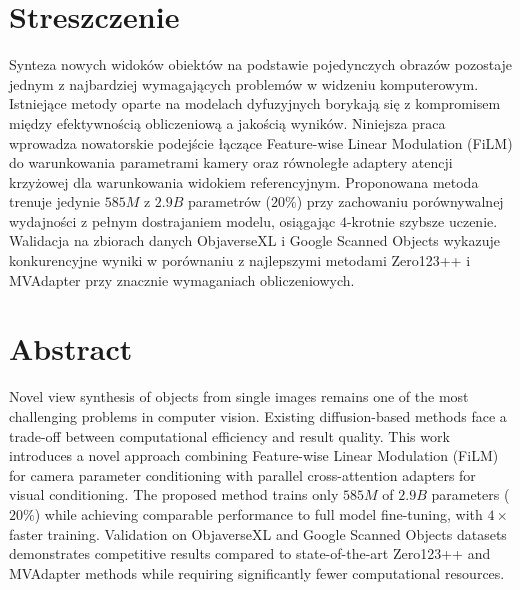\section*{Streszczenie}

Synteza nowych widoków obiektów na podstawie pojedynczych obrazów pozostaje jednym z najbardziej wymagających problemów w widzeniu komputerowym. Istniejące metody oparte na modelach dyfuzyjnych borykają się z kompromisem między efektywnością obliczeniową a jakością wyników. Niniejsza praca wprowadza nowatorskie podejście łączące Feature-wise Linear Modulation (FiLM) do warunkowania parametrami kamery oraz równoległe adaptery atencji krzyżowej dla warunkowania widokiem referencyjnym.
Proponowana metoda trenuje jedynie $585M$ z $2.9B$ parametrów ($20\%$) przy zachowaniu porównywalnej wydajności z pełnym dostrajaniem modelu, osiągając $4$-krotnie szybsze uczenie. Walidacja na zbiorach danych ObjaverseXL i Google Scanned Objects wykazuje konkurencyjne wyniki w porównaniu z najlepszymi metodami Zero123++ i MVAdapter przy znacznie wymaganiach obliczeniowych.

\section*{Abstract}

Novel view synthesis of objects from single images remains one of the most challenging problems in computer vision. Existing diffusion-based methods face a trade-off between computational efficiency and result quality. This work introduces a novel approach combining Feature-wise Linear Modulation (FiLM) for camera parameter conditioning with parallel cross-attention adapters for visual conditioning.
The proposed method trains only $585M$ of $2.9B$ parameters ($20\%$) while achieving comparable performance to full model fine-tuning, with $4\times$ faster training. Validation on ObjaverseXL and Google Scanned Objects datasets demonstrates competitive results compared to state-of-the-art Zero123++ and MVAdapter methods while requiring significantly fewer computational resources.
